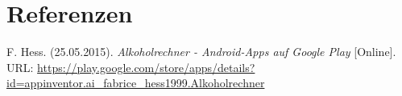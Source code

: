 \chapter{Referenzen}
\begin{thebibliography}{9}
  
  F. Hess. (25.05.2015). \emph{Alkoholrechner - Android-Apps auf Google Play} [Online]. URL: \url{https://play.google.com/store/apps/details?id=appinventor.ai_fabrice_hess1999.Alkoholrechner}

\end{thebibliography}